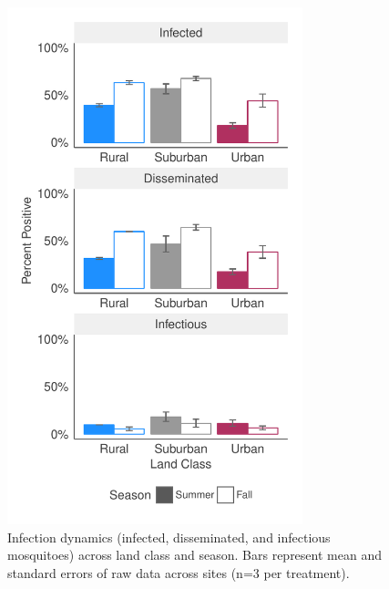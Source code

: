 \documentclass[12pt]{article}
\begin{document}
\begin{figure}
\centering\includegraphics[height=15cm, keepaspectratio]{Figure4.pdf}
\caption{Infection dynamics (infected, disseminated, and infectious mosquitoes) across land class and season. Bars represent mean and standard errors of raw data across sites (n=3 per treatment).}
\label{Fig:Infxclass}
\end{figure}
\end{document}
